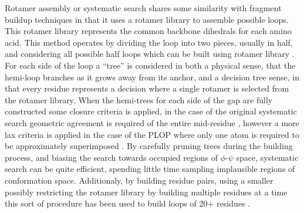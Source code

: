 Rotamer assembly or systematic search shares some similarity with fragment buildup techniques in that it uses a rotamer library to assemble possible loops.
This rotamer library represents the common backbone dihedrals for each amino acid.
This method operates by dividing the loop into two pieces, usually in half, and considering all possible half loops which can be built using rotamer library \cite{moult1986algorithm}.
For each side of the loop a ``tree'' is considered in both a physical sense, that the hemi-loop branches as it grows away from its anchor, and a decision tree sense, in that every residue represents a decision where a single rotamer is selected from the rotamer library.
When the hemi-trees for each side of the gap are fully constructed some closure criteria is applied, in the case of the original systematic search geometric agreement is required of the entire mid-residue \cite{moult1986algorithm}, however a more lax criteria is applied in the case of the PLOP where only one atom is required to be approximately superimposed \cite{jacobson2004hierarchical}.
By carefully pruning trees during the building process, and biasing the search towards occupied regions of $\phi$-$\psi$ space, systematic search can be quite efficient, spending little time sampling implausible regions of conformation space.
Additionaly, by building residue pairs, using a smaller
 possibly restricting the rotamer library by building multiple residues at a time this sort of procedure has been used to build loops of 20+ residues \cite{zhao2011progress}.


